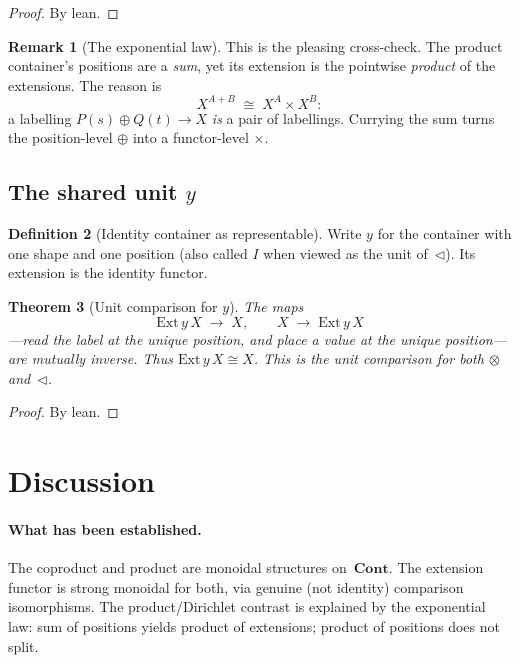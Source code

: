 \documentclass[11pt,a4paper]{article}
\theoremstyle{plain}
\newtheorem{theorem}{Theorem}[section]
\theoremstyle{definition}
\newtheorem{definition}[theorem]{Definition}
\newtheorem{remark}[theorem]{Remark}
\newcommand{\Cont}{\mathbf{Cont}}
\newcommand{\Ext}{\mathrm{Ext}}
\newcommand{\seq}{\mathbin{\triangleleft}}
\begin{document}
\begin{proof}
By lean.
\end{proof}

\begin{remark}[The exponential law]
This is the pleasing cross-check. The product container's positions are a
\emph{sum}, yet its extension is the pointwise \emph{product} of the
extensions. The reason is
\begin{equation}
  X^{A+B} \;\cong\; X^A \times X^B:
\end{equation}
a labelling $P(s) \oplus Q(t) \to X$ \emph{is} a pair of labellings. Currying
the sum turns the position-level $\oplus$ into a functor-level $\times$.
\end{remark}

\subsection{The shared unit $y$}

\begin{definition}[Identity container as representable]\label{def:y}
Write $y$ for the container with one shape and one position (also called
$I$ when viewed as the unit of~$\seq$). Its extension is the identity
functor.
\end{definition}

\begin{theorem}[Unit comparison for $y$]\label{thm:y-ext}
The maps
\begin{equation}
  \Ext\,y\,X \;\longrightarrow\; X,
  \qquad
  X \;\longrightarrow\; \Ext\,y\,X
\end{equation}
---read the label at the unique position, and place a value at the unique
position---are mutually inverse. Thus $\Ext\,y\,X \cong X$. This is the
unit comparison for both $\otimes$ and~$\seq$.
\end{theorem}

\begin{proof}
By lean.
\end{proof}

\section{Discussion}

\paragraph{What has been established.}
The coproduct and product are monoidal structures on~$\Cont$. The
extension functor is strong monoidal for both, via genuine (not identity)
comparison isomorphisms. The product/Dirichlet contrast is explained by
the exponential law: sum of positions yields product of extensions;
product of positions does not split.
\end{document}
